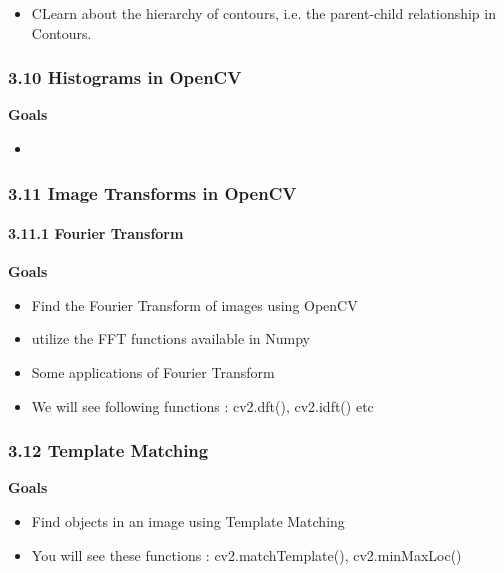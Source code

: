 \documentclass[11pt]{article}
\providecommand{\tightlist}{%
      \setlength{\itemsep}{0pt}\setlength{\parskip}{0pt}}
\begin{document}
\begin{itemize}
\tightlist
\item
  CLearn about the hierarchy of contours, i.e. the parent-child
  relationship in Contours.
\end{itemize}

    \subsubsection{3.10 Histograms in OpenCV}\label{histograms-in-opencv}

\textbf{Goals}

\begin{itemize}
\item
\end{itemize}

    \subsubsection{3.11 Image Transforms in
OpenCV}\label{image-transforms-in-opencv}

\paragraph{3.11.1 Fourier Transform}\label{fourier-transform}

\textbf{Goals}

\begin{itemize}
\item
  Find the Fourier Transform of images using OpenCV
\item
  utilize the FFT functions available in Numpy
\item
  Some applications of Fourier Transform
\item
  We will see following functions : cv2.dft(), cv2.idft() etc
\end{itemize}

    \subsubsection{3.12 Template Matching}\label{template-matching}

\textbf{Goals}

\begin{itemize}
\item
  Find objects in an image using Template Matching
\item
  You will see these functions : cv2.matchTemplate(), cv2.minMaxLoc()
\end{itemize}
\end{document}
